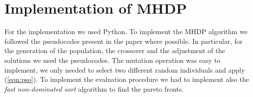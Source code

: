 \section{Implementation of MHDP}
For the implementation we used Python.
To implement the MHDP algorithm we followed the pseudocodes present in 
the paper where possible. In particular, for the generation of the population, the crossover
and the adjustment of the solutions we used the pseudocodes.
The mutation operation was easy to implement, we only needed to select two different random individuals and apply (\ref{eqn:pso}).
To implement the evaluation procedure we had to implement also the 
\textit{fast non-dominated sort} algorithm to find the pareto fronts.